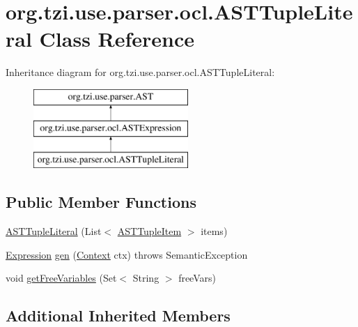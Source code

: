 \hypertarget{classorg_1_1tzi_1_1use_1_1parser_1_1ocl_1_1_a_s_t_tuple_literal}{\section{org.\-tzi.\-use.\-parser.\-ocl.\-A\-S\-T\-Tuple\-Literal Class Reference}
\label{classorg_1_1tzi_1_1use_1_1parser_1_1ocl_1_1_a_s_t_tuple_literal}
}
Inheritance diagram for org.\-tzi.\-use.\-parser.\-ocl.\-A\-S\-T\-Tuple\-Literal\-:\begin{figure}[H]
\begin{center}
\leavevmode
\includegraphics[height=3.000000cm]{classorg_1_1tzi_1_1use_1_1parser_1_1ocl_1_1_a_s_t_tuple_literal}
\end{center}
\end{figure}
\subsection*{Public Member Functions}
\begin{DoxyCompactItemize}
\item 
\hyperlink{classorg_1_1tzi_1_1use_1_1parser_1_1ocl_1_1_a_s_t_tuple_literal_a3fd340b39f464c7e93dfb5421812d5f0}{A\-S\-T\-Tuple\-Literal} (List$<$ \hyperlink{classorg_1_1tzi_1_1use_1_1parser_1_1ocl_1_1_a_s_t_tuple_item}{A\-S\-T\-Tuple\-Item} $>$ items)
\item 
\hyperlink{classorg_1_1tzi_1_1use_1_1uml_1_1ocl_1_1expr_1_1_expression}{Expression} \hyperlink{classorg_1_1tzi_1_1use_1_1parser_1_1ocl_1_1_a_s_t_tuple_literal_aa879a1ecc0f2c6a974bfc017958abec9}{gen} (\hyperlink{classorg_1_1tzi_1_1use_1_1parser_1_1_context}{Context} ctx)  throws Semantic\-Exception 
\item 
void \hyperlink{classorg_1_1tzi_1_1use_1_1parser_1_1ocl_1_1_a_s_t_tuple_literal_aaaa30ec1bc52c1bbfae175208d33f811}{get\-Free\-Variables} (Set$<$ String $>$ free\-Vars)
\end{DoxyCompactItemize}
\subsection*{Additional Inherited Members}


